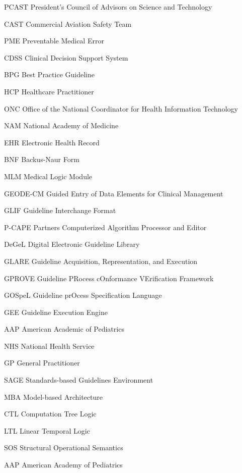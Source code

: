 \documentclass{uiucthesis2021}
\begin{document}
\begin{abbrevlist}
\item[PCAST]    President's Council of Advisors on Science and Technology
\item[CAST]     Commercial Aviation Safety Team
\item[PME]      Preventable Medical Error
\item[CDSS]     Clinical Decision Support System
\item[BPG]      Best Practice Guideline
\item[HCP]      Healthcare Practitioner
\item[ONC]      Office of the National Coordinator for Health Information Technology
\item[NAM]      National Academy of Medicine
\item[EHR]      Electronic Health Record
\item[BNF]      Backus-Naur Form
\item[MLM]      Medical Logic Module
\item[GEODE-CM] Guided Entry of Data Elements for Clinical Management
\item[GLIF]     Guideline Interchange Format
\item[P-CAPE]   Partners Computerized Algorithm Processor and Editor
\item[DeGeL]    Digital Electronic Guideline Library
\item[GLARE]    Guideline Acquisition, Representation, and Execution
\item[GPROVE]   Guideline PRocess cOnformance VErification Framework
\item[GOSpeL]   Guideline prOcess Specification Language
\item[GEE]      Guideline Execution Engine
\item[AAP]      American Academic of Pediatrics
\item[NHS]      National Health Service
\item[GP]       General Practitioner
\item[SAGE]     Standards-based Guidelines Environment
\item[MBA]      Model-based Architecture
\item[CTL]      Computation Tree Logic
\item[LTL]      Linear Temporal Logic
\item[SOS]      Structural Operational Semantics
\item[AAP]      American Academy of Pediatrics
\end{abbrevlist}
\end{document}

